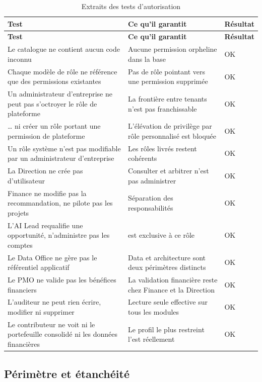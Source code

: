 \begin{longtable}{@{}L{7.4cm} L{5.2cm} C{1.5cm}@{}}
\caption{Extraits des tests d'autorisation}
\label{tab:tests-permissions}\\
\toprule
\textbf{Test} & \textbf{Ce qu'il garantit} & \textbf{Résultat} \\
\midrule
\endfirsthead
\toprule
\textbf{Test} & \textbf{Ce qu'il garantit} & \textbf{Résultat} \\
\midrule
\endhead
\bottomrule
\endfoot
Le catalogue ne contient aucun code inconnu
& Aucune permission orpheline dans la base & OK \\
Chaque modèle de rôle ne référence que des permissions existantes
& Pas de rôle pointant vers une permission supprimée & OK \\
Un administrateur d'entreprise ne peut pas s'octroyer le rôle de plateforme
& La frontière entre tenants n'est pas franchissable & OK \\
\ldots{} ni créer un rôle portant une permission de plateforme
& L'élévation de privilège par rôle personnalisé est bloquée & OK \\
Un rôle système n'est pas modifiable par un administrateur d'entreprise
& Les rôles livrés restent cohérents & OK \\
La Direction ne crée pas d'utilisateur
& Consulter et arbitrer n'est pas administrer & OK \\
Finance ne modifie pas la recommandation, ne pilote pas les projets
& Séparation des responsabilités & OK \\
L'AI Lead requalifie une opportunité, n'administre pas les comptes
&  est exclusive à ce rôle & OK \\
Le Data Office ne gère pas le référentiel applicatif
& Data et architecture sont deux périmètres distincts & OK \\
Le PMO ne valide pas les bénéfices financiers
& La validation financière reste chez Finance et la Direction & OK \\
L'auditeur ne peut rien écrire, modifier ni supprimer
& Lecture seule effective sur tous les modules & OK \\
Le contributeur ne voit ni le portefeuille consolidé ni les données financières
& Le profil le plus restreint l'est réellement & OK \\
\end{longtable}

\subsection{Périmètre et étanchéité}

